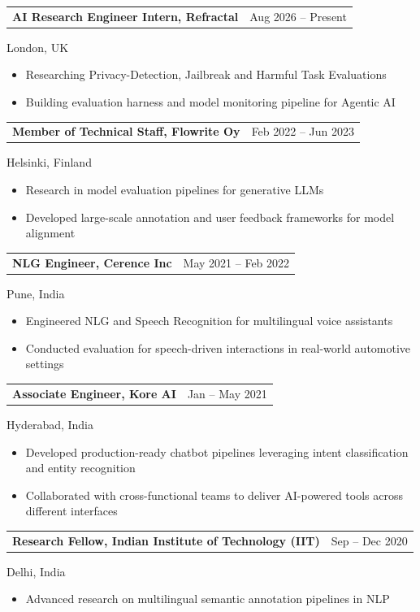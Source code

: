 \documentclass[11pt,letterpaper]{article}
\makeatletter
\newcommand{\entry}[2]{%
  \par\addvspace{7pt}\Needspace{5\baselineskip}%
  \noindent\begin{tabularx}{\linewidth}{@{}Xr@{}}%
    \textbf{#1} & {\small\sffamily\color{muted}#2}%
  \end{tabularx}\par\nobreak\vspace{-3pt}%
}
\makeatother
\begin{document}
\entry{AI Research Engineer Intern, Refractal}{Aug 2026 -- Present}
{\small\color{muted}London, UK\par}
\begin{itemize}
  \item Researching Privacy-Detection, Jailbreak and Harmful Task Evaluations
  \item Building evaluation harness and model monitoring pipeline for Agentic AI
\end{itemize}

\entry{Member of Technical Staff, Flowrite Oy}{Feb 2022 -- Jun 2023}
{\small\color{muted}Helsinki, Finland\par}
\begin{itemize}
  \item Research in model evaluation pipelines for generative LLMs
  \item Developed large-scale annotation and user feedback frameworks for model alignment
\end{itemize}

\entry{NLG Engineer, Cerence Inc}{May 2021 -- Feb 2022}
{\small\color{muted}Pune, India\par}
\begin{itemize}
  \item Engineered NLG and Speech Recognition for multilingual voice assistants
  \item Conducted evaluation for speech-driven interactions in real-world automotive settings
\end{itemize}

\entry{Associate Engineer, Kore AI}{Jan -- May 2021}
{\small\color{muted}Hyderabad, India\par}
\begin{itemize}
  \item Developed production-ready chatbot pipelines leveraging intent classification and entity recognition
  \item Collaborated with cross-functional teams to deliver AI-powered tools across different interfaces
\end{itemize}

\entry{Research Fellow, Indian Institute of Technology (IIT)}{Sep -- Dec 2020}
{\small\color{muted}Delhi, India\par}
\begin{itemize}
  \item Advanced research on multilingual semantic annotation pipelines in NLP
\end{itemize}
\end{document}
